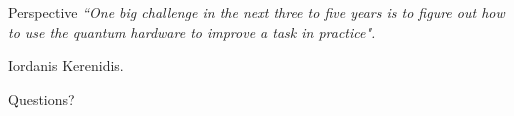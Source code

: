 \documentclass[8pt, xcolor={svgnames}, hyperref={linkcolor=black}]{beamer}
\begin{document}
\begin{frame}{Perspective}
\centering
\textit{``One big challenge in the next three to five years is to figure out how to 
   use the quantum hardware to improve a task in practice".} 

   Iordanis Kerenidis.
\end{frame}

\begin{frame}{}
\centering
\Large
Questions?
\end{frame}



\end{document}
